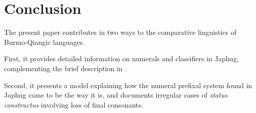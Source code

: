 \documentclass[oldfontcommands,oneside,a4paper,12pt]{article}
\begin{document}
\section{Conclusion}
The present paper contributes in two ways to the comparative linguistics of Burmo-Qiangic languages. 

First, it provides detailed information on numerals and classifiers in Japhug, complementing the brief description  in \citet[185-194]{jacques08}.


Second, it presents a model explaining how the numeral prefixal system found in Japhug came to be the way it is, and documents irregular cases of \textit{status constructus} involving loss of final consonants.




\end{document}
